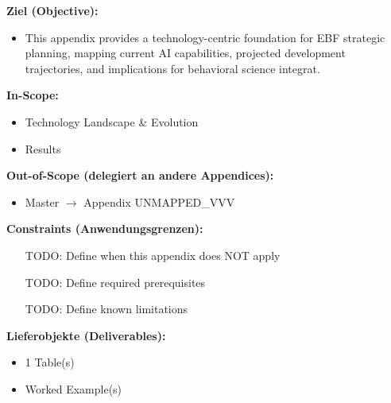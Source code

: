 %
%
%


\begin{tcolorbox}[
    colback=orange!5!white,
    colframe=orange!75!black,
    title={\textbf{Appendix Scope: Ziel / In-Scope / Out-of-Scope / Constraints}},
    fonttitle=\bfseries
]

\textbf{Ziel (Objective):}
\begin{itemize}[nosep]
    \item This appendix provides a technology-centric foundation for EBF strategic planning,
mapping current AI capabilities, projected development trajectories, and
implications for behavioral science integrat.
\end{itemize}

\textbf{In-Scope:}
\begin{itemize}[nosep]
    \item Technology Landscape \& Evolution
    \item Results
\end{itemize}

\textbf{Out-of-Scope (delegiert an andere Appendices):}
\begin{itemize}[nosep]
    \item Master $\rightarrow$ Appendix UNMAPPED_VVV
\end{itemize}

\textbf{Constraints (Anwendungsgrenzen):}
\begin{itemize}[nosep]
    \item [TODO: Define when this appendix does NOT apply]
    \item [TODO: Define required prerequisites]
    \item [TODO: Define known limitations]
\end{itemize}

\textbf{Lieferobjekte (Deliverables):}
\begin{itemize}[nosep]
    \item 1 Table(s)
    \item Worked Example(s)
\end{itemize}

\end{tcolorbox}


